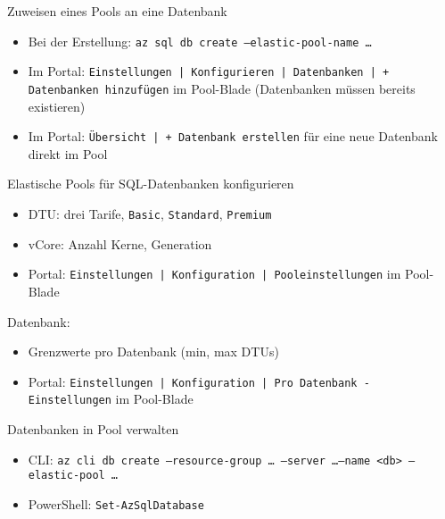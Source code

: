 \begin{flashcard}[Definition]{Zuweisen eines Pools an eine Datenbank}
    \begin{itemize}
        \item Bei der Erstellung:\newline
            \texttt{az sql db create --elastic-pool-name \ldots}
        \item Im Portal: \newline
            \texttt{Einstellungen | Konfigurieren | Datenbanken | + Datenbanken hinzufügen} im Pool-Blade\newline
            (Datenbanken müssen bereits existieren)
        \item Im Portal: \newline
            \texttt{Übersicht | + Datenbank erstellen} für eine neue Datenbank direkt im Pool
    \end{itemize}
\end{flashcard}

\begin{flashcard}[Definition]{Elastische Pools für SQL-Datenbanken konfigurieren}
    \begin{itemize}
        \item DTU: drei Tarife, \texttt{Basic}, \texttt{Standard}, \texttt{Premium}
        \item vCore: Anzahl Kerne, Generation
        \item Portal: \texttt{Einstellungen | Konfiguration | Pooleinstellungen} im Pool-Blade
    \end{itemize}
    Datenbank:
    \begin{itemize}
        \item Grenzwerte pro Datenbank (min, max DTUs)
        \item Portal: \texttt{Einstellungen | Konfiguration | Pro Datenbank - Einstellungen} im Pool-Blade
    \end{itemize}
\end{flashcard}

\begin{flashcard}[Definition]{Datenbanken in Pool verwalten}
    \begin{itemize}
        \item CLI:\newline
            \texttt{az cli db create --resource-group \ldots\ --server \ldots\newline --name <db> --elastic-pool \ldots}
        \item PowerShell:\newline
            \texttt{Set-AzSqlDatabase}
    \end{itemize}
\end{flashcard}


